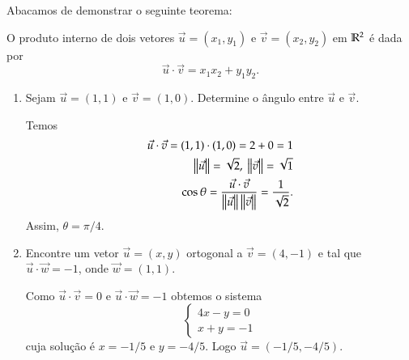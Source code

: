 Abacamos de demonstrar o seguinte teorema:
\begin{teorema}
  O produto interno de dois vetores $\vec{u} = (x_1, y_1)$ e $\vec{v} = (x_2, y_2)$ em $\mathbb{R}^2$ \'e dada por
  \[
    \vec{u}\cdot\vec{v} = x_1x_2 + y_1y_2.
  \]
\end{teorema}

\begin{exemplos}
  \begin{enumerate}
    \item Sejam $\vec{u} = (1, 1)$ e $\vec{v} = (1,0)$. Determine o \^angulo entre $\vec{u}$ e $\vec{v}$.
    \begin{solucao}
      Temos
      \begin{align*}
        \vec{u}\cdot\vec{v} = (1, 1)\cdot(1,0) = 2 + 0 = 1\\
        \left\Vert{\vec{u}}\right\Vert = \sqrt{2},\ \left\Vert{\vec{v}}\right\Vert = \sqrt{1}\\
        \cos\theta = \frac{\vec{u}\cdot\vec{v}}{\left\Vert{\vec{u}}\right\Vert\left\Vert{\vec{v}}\right\Vert} = \dfrac{1}{\sqrt{2}}.
      \end{align*}
      Assim, $\theta = \pi/4$.
    \end{solucao}
    \item Encontre um vetor $\vec{u} = (x, y)$ ortogonal a $\vec{v} = (4, -1)$ e tal que $\vec{u}\cdot\vec{w} = -1$, onde $\vec{w} = (1,1)$.
    \begin{solucao}
      Como $\vec{u}\cdot\vec{v} = 0$ e $\vec{u}\cdot\vec{w} = -1$ obtemos o sistema
      \[
        \begin{cases}
          4x - y = 0\\
          x + y = -1
        \end{cases}
      \]
      cuja solu\c{c}\~ao \'e $x = -1/5$ e $y = -4/5$. Logo $\vec{u} = (-1/5, -4/5)$.
    \end{solucao}
  \end{enumerate}
\end{exemplos}

